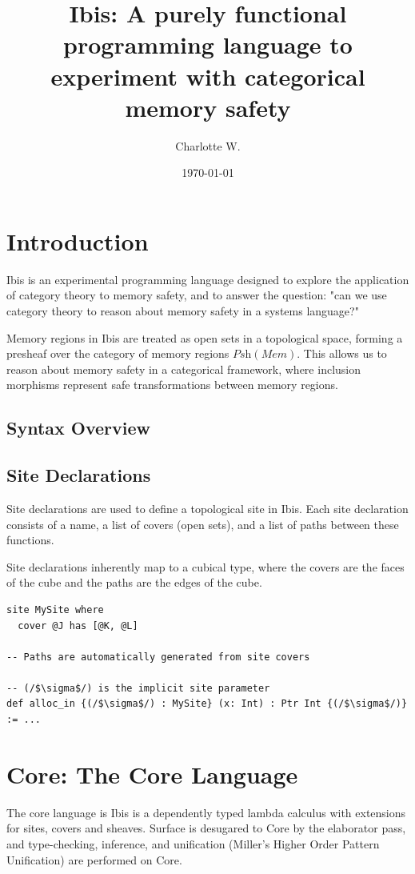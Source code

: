 \documentclass[11pt]{article}
\title{Ibis: A purely functional programming language to experiment with categorical memory safety}
\author{Charlotte W.}
\date{\today}
\begin{document}
\maketitle

\tableofcontents

\section{Introduction}
Ibis is an experimental programming language designed to explore the application of category theory to memory safety, and to answer the question: "can we use category theory to reason about memory safety in a systems language?"

Memory regions in Ibis are treated as open sets in a topological space, forming a presheaf over the category of memory regions $\textit{Psh}(\textit{Mem})$. This allows us to reason about memory safety in a categorical framework,
where inclusion morphisms represent safe transformations between memory regions.

\pagebreak

\subsection{Syntax Overview}

\subsection{Site Declarations}
Site declarations are used to define a topological site in Ibis.
Each site declaration consists of a name, a list of covers (open sets), and a list of paths between these functions.

Site declarations inherently map to a cubical type, where the covers are the faces of the cube and the paths are the edges of the cube.

\begin{lstlisting}[language=Ibis, caption={Example of a site declaration in Ibis}]
site MySite where
  cover @J has [@K, @L]

-- Paths are automatically generated from site covers

-- (/$\sigma$/) is the implicit site parameter
def alloc_in {(/$\sigma$/) : MySite} (x: Int) : Ptr Int {(/$\sigma$/)} := ...
\end{lstlisting}

\pagebreak

\section{Core: The Core Language}
The core language is Ibis is a dependently typed lambda calculus with extensions for sites, covers and sheaves. Surface is desugared to Core by the
elaborator pass, and type-checking, inference, and unification (Miller's Higher Order Pattern Unification) are performed on Core.
\vspace{0.6em}
\end{document}
